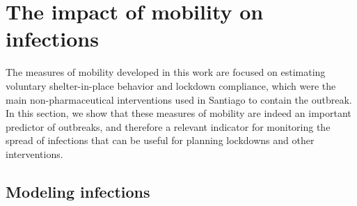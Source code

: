 


\section{The impact of mobility on infections} \label{sec:infections}

The measures of mobility developed in this work are focused on estimating voluntary shelter-in-place behavior and lockdown compliance, which were the main non-pharmaceutical interventions used in Santiago to contain the outbreak. In this section, we show that these measures of mobility are indeed an important predictor of outbreaks, and therefore a relevant indicator for monitoring the spread of infections that can be useful for planning lockdowns and other interventions.

\subsection{Modeling infections}  

